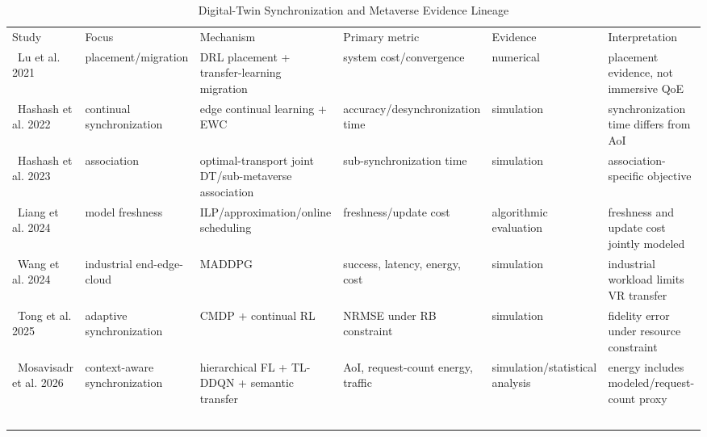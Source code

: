 \begin{table}[!t]\centering\caption{Digital-Twin Synchronization and Metaverse Evidence Lineage}\label{tab:dtexpanded}\scriptsize\begin{tabularx}{\textwidth}{p{}p{}p{}p{}p{}Y}\toprule Study & Focus & Mechanism & Primary metric & Evidence & Interpretation \\\ \midrule Lu et al. 2021 & placement/migration & DRL placement + transfer-learning migration & system cost/convergence & numerical & placement evidence, not immersive QoE \\\ Hashash et al. 2022 & continual synchronization & edge continual learning + EWC & accuracy/desynchronization time & simulation & synchronization time differs from AoI \\\ Hashash et al. 2023 & association & optimal-transport joint DT/sub-metaverse association & sub-synchronization time & simulation & association-specific objective \\\ Liang et al. 2024 & model freshness & ILP/approximation/online scheduling & freshness/update cost & algorithmic evaluation & freshness and update cost jointly modeled \\\ Wang et al. 2024 & industrial end-edge-cloud & MADDPG & success, latency, energy, cost & simulation & industrial workload limits VR transfer \\\ Tong et al. 2025 & adaptive synchronization & CMDP + continual RL & NRMSE under RB constraint & simulation & fidelity error under resource constraint \\\ Mosavisadr et al. 2026 & context-aware synchronization & hierarchical FL + TL-DDQN + semantic transfer & AoI, request-count energy, traffic & simulation/statistical analysis & energy includes modeled/request-count proxy \\\ \bottomrule\end{tabularx}\end{table}